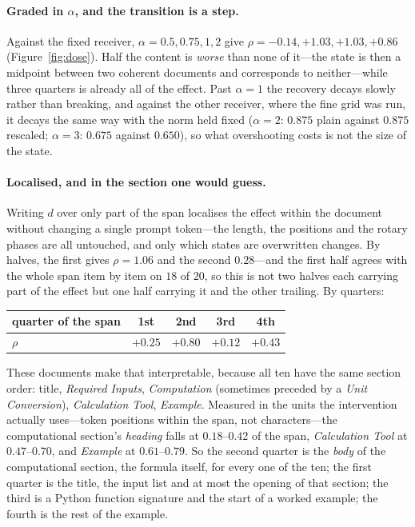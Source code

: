 \documentclass{article}
\newcommand{\dvec}{\ensuremath{d}}
\begin{document}
\paragraph{Graded in $\alpha$, and the transition is a step.} Against the fixed
receiver, $\alpha = 0.5, 0.75, 1, 2$ give $\rho = -0.14, +1.03, +1.03, +0.86$
(Figure~\ref{fig:dose}). Half the content is \emph{worse} than none of it---the
state is then a midpoint between two coherent documents and corresponds to
neither---while three quarters is already all of the effect. Past $\alpha=1$ the
recovery decays slowly rather than breaking, and against the other receiver,
where the fine grid was run, it decays the same way with the norm held fixed
($\alpha=2$: $0.875$ plain against $0.875$ rescaled; $\alpha=3$: $0.675$ against
$0.650$), so what overshooting costs is not the size of the state.

\paragraph{Localised, and in the section one would guess.} Writing $\dvec$ over
only part of the span localises the effect within the document without changing
a single prompt token---the length, the positions and the rotary phases are all
untouched, and only which states are overwritten changes. By halves, the first
gives $\rho = 1.06$ and the second $0.28$---and the first half agrees with the
whole span item by item on $18$ of $20$, so this is not two halves each carrying
part of the effect but one half carrying it and the other trailing. By quarters:
\begin{center}
\begin{tabular}{@{}lcccc@{}}
\toprule
quarter of the span & 1st & \textbf{2nd} & 3rd & 4th \\
\midrule
$\rho$ & $+0.25$ & $\mathbf{+0.80}$ & $+0.12$ & $+0.43$ \\
\bottomrule
\end{tabular}
\end{center}

These documents make that interpretable, because all ten have the same section
order: title, \emph{Required Inputs}, \emph{Computation} (sometimes preceded by a
\emph{Unit Conversion}), \emph{Calculation Tool}, \emph{Example}. Measured in the
units the intervention actually uses---token positions within the span, not
characters---the computational section's \emph{heading} falls at $0.18$--$0.42$
of the span, \emph{Calculation Tool} at $0.47$--$0.70$, and \emph{Example} at
$0.61$--$0.79$. So the second quarter is the \emph{body} of the computational
section, the formula itself, for every one of the ten; the first quarter is the
title, the input list and at most the opening of that section; the third is a
Python function signature and the start of a worked example; the fourth is the
rest of the example.
\end{document}
